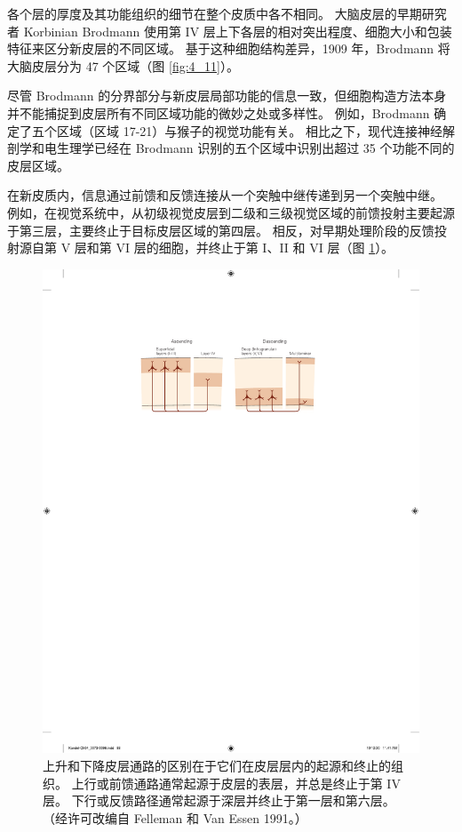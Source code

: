 各个层的厚度及其功能组织的细节在整个皮质中各不相同。 
大脑皮层的早期研究者 Korbinian Brodmann 使用第 IV 层上下各层的相对突出程度、细胞大小和包装特征来区分新皮层的不同区域。 
基于这种细胞结构差异，1909 年，Brodmann 将大脑皮层分为 47 个区域（图 \ref{fig:4_11}）。


尽管 Brodmann 的分界部分与新皮层局部功能的信息一致，但细胞构造方法本身并不能捕捉到皮层所有不同区域功能的微妙之处或多样性。 
例如，Brodmann 确定了五个区域（区域 17-21）与猴子的视觉功能有关。 
相比之下，现代连接神经解剖学和电生理学已经在 Brodmann 识别的五个区域中识别出超过 35 个功能不同的皮层区域。


在新皮质内，信息通过前馈和反馈连接从一个突触中继传递到另一个突触中继。 
例如，在视觉系统中，从初级视觉皮层到二级和三级视觉区域的前馈投射主要起源于第三层，主要终止于目标皮层区域的第四层。 
相反，对早期处理阶段的反馈投射源自第 V 层和第 VI 层的细胞，并终止于第 I、II 和 VI 层（图 \ref{fig:4_12}）。

\begin{figure}[htbp]
	\centering
	\includegraphics[width=1.0\linewidth]{chap04/fig_4_12}
	\caption{上升和下降皮层通路的区别在于它们在皮层层内的起源和终止的组织。 
		上行或前馈通路通常起源于皮层的表层，并总是终止于第 IV 层。 
		下行或反馈路径通常起源于深层并终止于第一层和第六层。 （经许可改编自 Felleman 和 Van Essen 1991。）}
	\label{fig:4_12}
\end{figure}


